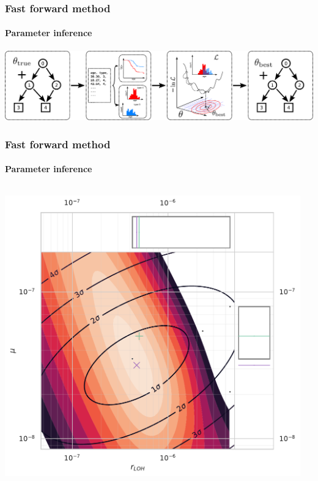 \documentclass{beamer}
\begin{document}
\begin{frame}
    \frametitle{Fast forward method}
    \framesubtitle{Parameter inference}
    \includegraphics[width=\textwidth]{figures/flowchart.pdf}
\end{frame}

\begin{frame}
    \frametitle{Fast forward method}
    \framesubtitle{Parameter inference}
    \begin{columns}
        \begin{column}{0.5\textwidth}
        \includegraphics[width=\textwidth]{figures/scatterplot_floating_mutrates_fixed_32}
        \end{column}
        \begin{column}{0.5\textwidth}

\end{column}
\end{columns}
\end{frame}
\end{document}
